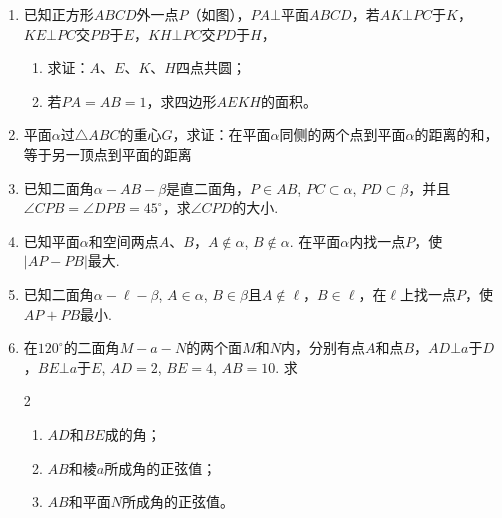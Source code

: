 \begin{enumerate}
\begin{minipage}{.45\textwidth}
\begin{tikzpicture}[scale=1.3]
\end{tikzpicture}
 \end{minipage}
 \hfill
 \begin{minipage}{.45\textwidth}
 \centering
 \end{minipage}
 

 \item 已知正方形$ABCD$外一点$P$（如图），$PA\bot $平面$ABCD$，若$AK\bot PC$于$K$，$KE\bot PC$交$PB$于$E$，$KH\bot PC$交$PD$于$H$，
\begin{enumerate}[(1)]
\item 求证：$A$、$E$、$K$、$H$四点共圆；
\item 若$PA=AB=1$，求四边形$AEKH$的面积。
\end{enumerate}

\item 平面$\alpha$过$\triangle ABC$的重心$G$，求证：在平面$\alpha$同侧的两个点到平面$\alpha$的距离的和，等于另一顶点到平面的距离
\item 已知二面角$\alpha-AB-\beta$是直二面角，$P\in AB$, $PC\subset \alpha$, $PD\subset \beta$，并且$\angle CPB=\angle DPB=45^{\circ}$，求$\angle CPD$的大小.
\item 已知平面$\alpha$和空间两点$A$、$B$，$A\notin \alpha$, $B\notin \alpha$. 在平面$\alpha$内找一点$P$，使$|AP-PB|$最大.
\item 已知二面角$\alpha-\ell-\beta$, $A\in\alpha$, $B\in\beta$且$A\notin \ell$，$B\in\ell$，在$\ell$上找一点$P$，使$AP+PB$最小.
\item 在$120^{\circ}$的二面角$M-a-N$的两个面$M$和$N$内，分别有点$A$和点$B$，$AD\bot a$于$D$，$BE\bot a$于$E$, $AD=2$, $BE=4$, $AB=10$. 求
\begin{multicols}{2}
 \begin{enumerate}[(1)]
\item $AD$和$BE$成的角；
\item $AB$和棱$a$所成角的正弦值；
\item $AB$和平面$N$所成角的正弦值。
\end{enumerate}   
\end{multicols}



\end{enumerate}
